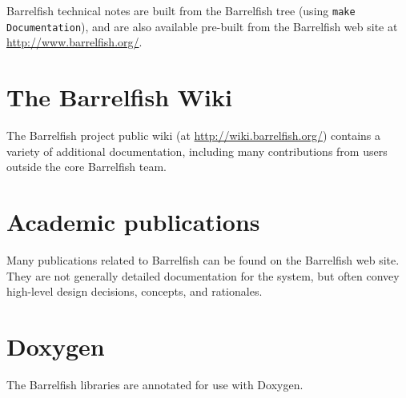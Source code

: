 \documentclass[a4paper,twoside]{report} %
\begin{document}
Barrelfish technical notes are built from the Barrelfish tree (using
\texttt{make Documentation}), and are also available pre-built from the
Barrelfish web site at \url{http://www.barrelfish.org/}.

\section{The Barrelfish Wiki}

The Barrelfish project public wiki (at
\url{http://wiki.barrelfish.org/}) contains a variety of additional
documentation, including many contributions from users outside the
core Barrelfish team.

\section{Academic publications}

Many publications related to Barrelfish can be found on the Barrelfish
web site.  They are not generally detailed documentation for the
system, but often convey high-level design decisions, concepts, and
rationales.

\section{Doxygen}

The Barrelfish libraries are annotated for use with Doxygen. 



\end{document}
